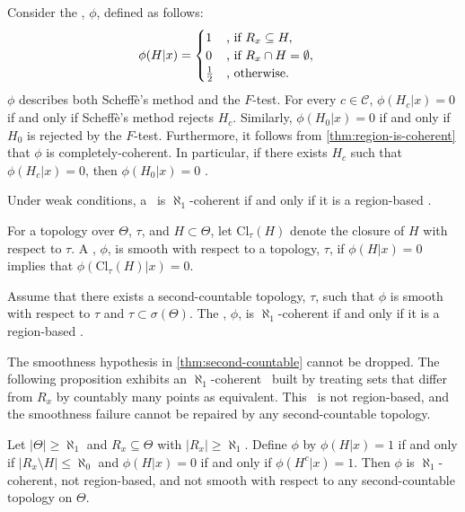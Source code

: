 \begin{example}
Consider the \summ, $\phi$, defined as follows:
\begin{align*}
 \phi(H|x) &=
 \begin{cases}
  1 & \text{, if } R_x \subseteq H, \\
  0 & \text{, if } R_x \cap H = \emptyset, \\
  \frac{1}{2} & \text{, otherwise.}
 \end{cases}
\end{align*}
$\phi$ describes both Scheff\`{e}'s method and the $F$-test. For every $c \in \mathcal{C}$, $\phi(H_c|x) = 0$ if and only if Scheff\`{e}'s method rejects $H_c$. Similarly, $\phi(H_0|x) = 0$ if and only if $H_0$ is rejected by the $F$-test. Furthermore, it follows from \cref{thm:region-is-coherent} that $\phi$ is completely-coherent. In particular, if there exists $H_c$ such that $\phi(H_c|x) = 0$, then $\phi(H_0|x) = 0$ \citep{Gabriel1969}.
\end{example}

Under weak conditions, a \summ \ is
$\aleph_1$-coherent if and only if
it is a region-based \summ.

\begin{definition}
 For a topology over $\Theta$, $\tau$, 
 and $H \subset \Theta$, let
 $\text{Cl}_\tau(H)$ denote the
 closure of $H$ with respect to $\tau$. 
 A \summ, $\phi$, is smooth with respect to
 a topology, $\tau$, if
 $\phi(H|x) = 0$ implies that
 $\phi(\text{Cl}_\tau(H)|x) = 0$.
\end{definition}

\begin{theorem}
 \label{thm:second-countable}
 Assume that there exists 
 a second-countable topology, $\tau$, 
 such that $\phi$ is smooth
 with respect to $\tau$ and
 $\tau \subset \sigma(\Theta)$.
 The \summ, $\phi$, is $\aleph_1$-coherent
 if and only if
 it is a region-based \summ.
\end{theorem}

The smoothness hypothesis in \cref{thm:second-countable} cannot be dropped. The following proposition exhibits an $\aleph_1$-coherent \summ \ built by treating sets that differ from $R_x$ by countably many points as equivalent. This \summ \ is not region-based, and the smoothness failure cannot be repaired by any second-countable topology.

\begin{proposition}
 \label{prop:second-countable}
 Let $|\Theta| \geq \aleph_1$ and $R_x \subseteq \Theta$ with $|R_x| \geq \aleph_1$. Define $\phi$ by $\phi(H|x) = 1$ if and only if $|R_x \setminus H| \leq \aleph_0$ and $\phi(H|x) = 0$ if and only if $\phi(H^c|x) = 1$. Then $\phi$ is $\aleph_1$-coherent, not region-based, and not smooth with respect to any second-countable topology on $\Theta$.
\end{proposition}

